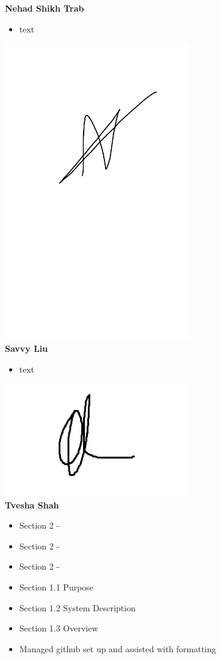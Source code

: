 \documentclass[]{article}
\numberwithin{figure}{section}
\begin{document}
\textbf{Nehad Shikh Trab}
\begin{itemize}
    \setlength\itemindent{2em}
\item text
\end{itemize}
\includegraphics[width=0.6\textwidth]{Nehad.png}
\\
\textbf{Savvy Liu}
\begin{itemize}
    \setlength\itemindent{2em}
    \item text
\end{itemize} 
\includegraphics[width=0.6\textwidth]{Savvy.png}
\\
\textbf{Tvesha Shah}
\begin{itemize}
    \setlength\itemindent{2em}
    \item Section 2 - 
    \item Section 2 - 
    \item Section 2 - 
    \item Section 1.1 Purpose
    \item Section 1.2 System Description
    \item Section 1.3 Overview
    \item Managed github set up and assisted with formatting
\end{itemize} 
\end{document}
